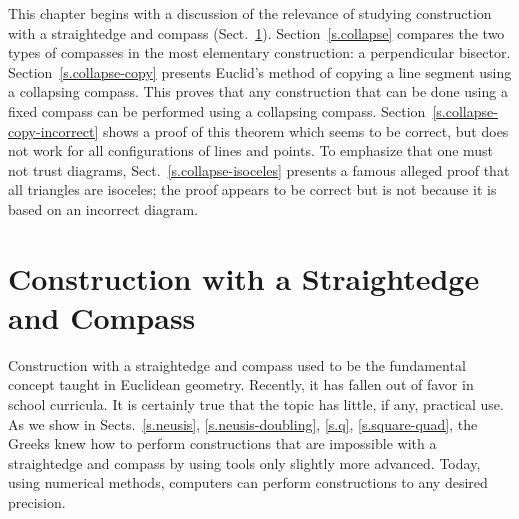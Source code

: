 \begin{figure}[hb]
{
}
\label{fig.fixed-compass}
\label{fig.collapsing-compass}
\end{figure}

This chapter begins with a discussion of the relevance of studying construction with a straightedge and compass (Sect.~\ref{s.relevance}).
Section~\ref{s.collapse} compares the two types of compasses in the most elementary construction: a perpendicular bisector. Section~\ref{s.collapse-copy} presents Euclid's method of copying a line segment using a collapsing compass. This proves that any construction that can be done using a fixed compass can be performed using a collapsing compass. Section~\ref{s.collapse-copy-incorrect} shows a proof of this theorem which seems to be correct, but does not work for all configurations of lines and points. To emphasize that one must not trust diagrams, Sect.~\ref{s.collapse-isoceles} presents a famous alleged proof that all triangles are isoceles; the proof appears to be correct but is not because it is based on an incorrect diagram.

\section{Construction with a Straightedge and Compass}\label{s.relevance}

Construction with a straightedge and compass used to be the fundamental concept taught in Euclidean geometry. Recently, it has fallen out of favor in school curricula. It is certainly true that the topic has little, if any, practical use. As we show in Sects.~\ref{s.neusis}, \ref{s.neusis-doubling}, \ref{s.q}, \ref{s.square-quad}, the Greeks knew how to perform constructions that are impossible with a straightedge and compass by using tools only slightly more advanced. Today, using numerical methods, computers can perform constructions to any desired precision.


